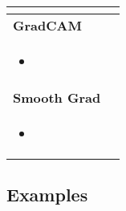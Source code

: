 \begin{summary}
\begin{center}
\begin{tabular}{ll}
{\begin{itemize}
            \end{itemize}} \\
            \midrule
            \textbf{GradCAM} & \\
            \multicolumn{2}{p{\linewidth}}{
            \begin{itemize}
                \item 
            \end{itemize}} \\
            \midrule
            \textbf{Smooth Grad} & \\
            \multicolumn{2}{p{\linewidth}}{
            \begin{itemize}
                \item 
            \end{itemize}} \\
            \bottomrule
        \end{tabular}
    \end{center}
\end{summary}

\subsection{Examples}
